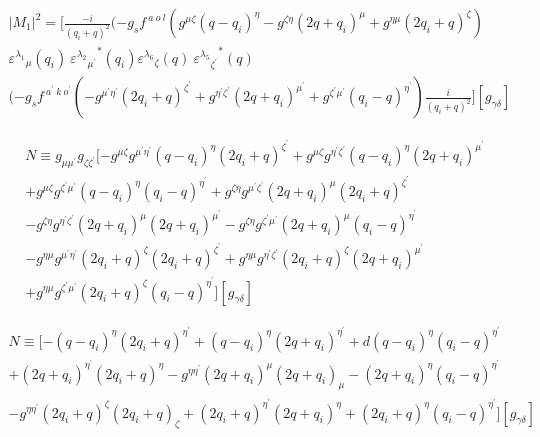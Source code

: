 \begin{equation}
\begin{split}
|M_1|^2=[\frac{-i}{(q_i +q)^2}(-g_s f^{\:a\:o\:l}(g^{{\mu}{\zeta}}(q-q_i)^{\eta}-g^{{\zeta}{\eta}}(2q +q_i)^{\mu}+g^{{\eta}{\mu}}(2q_i +q)^{\zeta})\\
{\varepsilon^{\lambda_1}}_{\mu} (q_i)\:{{\varepsilon^{\lambda_2}}_{{\mu}^{\prime}}}^* (q_i) {\varepsilon^{\lambda_6}}_{\zeta} (q)\:{{\varepsilon^{\lambda_5}}_{{\zeta}^{\prime}}}^* (q)\\
(-g_s f^{\:a^{\prime}\:k\:o^{\prime}}(-g^{{{\mu}^{\prime}}{{\eta}^{\prime}}}(2q_i+q)^{{\zeta}^{\prime}}+g^{{{\eta}^{\prime}}{{\zeta}^{\prime}}}(2q +q_i)^{{\mu}^{\prime}}+g^{{{\zeta}^{\prime}}{{\mu}^{\prime}}}(q_i-q)^{{\eta}^{\prime}})\frac{i}{(q_i +q)^2}][g_{{\gamma}{\delta}}]
\end{split}
\end{equation}

\begin{equation}
\begin{split}
N\equiv g_{{\mu}{{\mu}^{\prime}}} g_{{\zeta}{{\zeta}^{\prime}}}[-g^{{\mu}{\zeta}}g^{{{\mu}^{\prime}}{{\eta}^{\prime}}}(q-q_i)^{{\eta}}(2q_i+q)^{{\zeta}^{\prime}}+g^{{\mu}{\zeta}}g^{{{\eta}^{\prime}}{{\zeta}^{\prime}}}(q-q_i)^{\eta}(2q +q_i)^{{\mu}^{\prime}}\\+g^{{\mu}{\zeta}}g^{{{\zeta}^{\prime}}{{\mu}^{\prime}}}(q-q_i)^{\eta}(q_i -q)^{{\eta}^{\prime}}+g^{{\zeta}{\eta}}g^{{{\mu}^{\prime}}{{\zeta}^{\prime}}}(2q +q_i)^{\mu}(2q_i+q)^{{\zeta}^{\prime}}\\
-g^{{\zeta}{\eta}}g^{{{\eta}^{\prime}}{{\zeta}^{\prime}}}(2q +q_i)^{\mu}(2q +q_i)^{{\mu}^{\prime}}-g^{{\zeta}{\eta}}g^{{{\zeta}^{\prime}}{{\mu}^{\prime}}}(2q +q_i)^{\mu}(q_i -q)^{{\eta}^{\prime}}\\
-g^{{\eta}{\mu}}g^{{{\mu}^{\prime}}{{\eta}^{\prime}}}(2q_i +q)^{\zeta}(2q_i+q)^{{\zeta}^{\prime}}+g^{{\eta}{\mu}}g^{{{\eta}^{\prime}}{{\zeta}^{\prime}}}(2q_i +q)^{\zeta}(2q +q_i)^{{\mu}^{\prime}}\\
+g^{{\eta}{\mu}}g^{{{\zeta}^{\prime}}{{\mu}^{\prime}}}(2q_i +q)^{\zeta}(q_i -q)^{{\eta}^{\prime}}][g_{{\gamma}{\delta}}]
\end{split}
\end{equation}


\begin{equation}
\begin{split}
N\equiv [-(q-q_i)^{{\eta}}(2q_i+q)^{{\eta}^{\prime}}+(q-q_i)^{\eta}(2q +q_i)^{{\eta}^{\prime}}+d(q-q_i)^{\eta}(q_i -q)^{{\eta}^{\prime}}\\+(2q +q_i)^{{\eta}^{\prime}}(2q_i+q)^{{\eta}}
-g^{{\eta}{{\eta}^{\prime}}}(2q +q_i)^{\mu}(2q +q_i)_{{\mu}}-(2q +q_i)^{\eta}(q_i -q)^{{\eta}^{\prime}}\\
-g^{{\eta}{{\eta}^{\prime}}}(2q_i +q)^{\zeta}(2q_i+q)_{{\zeta}}+(2q_i +q)^{{\eta}^{\prime}}(2q +q_i)^{{\eta}}
+(2q_i +q)^{\eta}(q_i -q)^{{\eta}^{\prime}}][g_{{\gamma}{\delta}}]
\end{split}
\end{equation}

